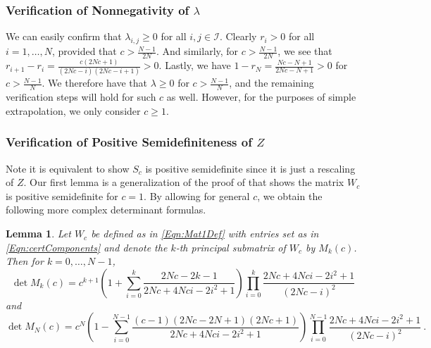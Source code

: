 \documentclass[11pt]{article}
\numberwithin{equation}{section}
\newtheorem{lemma}[thm]{Lemma}
\theoremstyle{definition}
\theoremstyle{definition}
\theoremstyle{definition}
\newcommand{\1}{\mathbf{1}}
\newcommand{\detDenom}[1]{2N{#1}+4N{#1}i-2i^2+1}
\newcommand{\psiNum}[1]{({#1}-1)(2N{#1}-2N+1)(2N{#1}+1)}
\begin{document}
\subsubsection{Verification of Nonnegativity of \texorpdfstring{$\lambda$}{Lambda}} \label{SubSubSec:Step1}
We can easily confirm that $\lambda_{i,j} \geq 0$ for all $i,j \in \mathcal{I}$. Clearly $r_i > 0$ for all $i = 1,\dots,N$, provided that $c > \frac{N-1}{2N}$. And similarly, for $c > \frac{N-1}{2N}$, we see that $r_{i+1}-r_i = \frac{c(2Nc+1)}{(2Nc-i)(2Nc-i+1)} > 0$. Lastly, we have $1-r_N = \frac{Nc-N+1}{2Nc-N+1} > 0$ for $c > \frac{N-1}{N}$. We therefore have that $\lambda \geq 0$ for $c > \frac{N-1}{N}$, and the remaining verification steps will hold for such $c$ as well. However, for the purposes of simple extrapolation, we only consider $c\geq 1$.

\subsubsection{Verification of Positive Semidefiniteness of \texorpdfstring{$Z$}{Z}} \label{SubSubSec:Step2}
Note it is equivalent to show $S_c$ is positive semidefinite since it is just a rescaling of $Z$. 
Our first lemma is a generalization of the proof of \cite[Lemma 3.3]{FirstPEP} that shows the matrix $W_c$ is positive semidefinite for $c=1$. By allowing for general $c$, we obtain the following more complex determinant formulas.
\begin{lemma} \label{Lem:detFormula}
    Let $W_c$ be defined as in \eqref{Eqn:Mat1Def} with entries set as in \eqref{Eqn:certComponents} and denote the $k$-th principal submatrix of $W_c$ by $M_k(c)$. Then for $k=0,\dots,N-1$,
    \begin{equation}\label{Eqn:detMk}
        \det M_k(c) = c^{k+1}\left(1+\sum_{i=0}^k \frac{2Nc-2k-1}{\detDenom{c}}\right) \prod_{i=0}^k \frac{\detDenom{c}}{(2Nc-i)^2}
    \end{equation}
    and
    \begin{equation}\label{Eqn:detMN}
        \det M_N(c) = c^N \left(1 - \sum_{i=0}^{N-1} \frac{\psiNum{c}}{\detDenom{c}}\right) \prod_{i=0}^{N-1} \frac{\detDenom{c}}{(2Nc - i)^2} \ .
    \end{equation}
\end{lemma}
\end{document}
